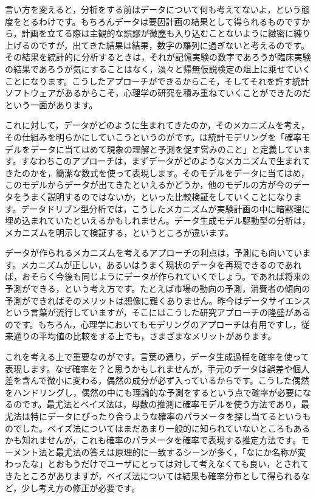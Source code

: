 \documentclass{ltjsbook}
\begin{document}
言い方を変えると，分析をする前はデータについて何も考えてないよ，という態度をとるわけです。もちろんデータは要因計画の結果として得られるものですから，計画を立てる際は主観的な誤謬が微塵も入り込むことないように緻密に練り上げるのですが，出てきた結果は結果，数字の羅列に過ぎないと考えるのです。その結果を統計的に分析するときは，それが記憶実験の数字であろうが臨床実験の結果であろうが気にすることはなく，淡々と帰無仮説検定の俎上に乗せていくことになります。こうしたアプローチができるからこそ，そしてそれを許す統計ソフトウェアがあるからこそ，心理学の研究を積み重ねていくことができたのだという一面があります。

これに対して，データがどのように生まれてきたのか，そのメカニズムを考え，その仕組みを明らかにしていこうというのがです。\citet{Matsuura201610}は統計モデリングを「確率モデルをデータに当てはめて現象の理解と予測を促す営みのこと」と定義しています。すなわちこのアプローチは，まずデータがどのようなメカニズムで生まれてきたのかを，簡潔な数式を使って表現します。そのモデルをデータに当てはめ，このモデルからデータが出てきたといえるかどうか，他のモデルの方が今のデータをうまく説明するのではないか，といった比較検証をしていくことになります。データドリブン型分析では，こうしたメカニズムが実験計画の中に暗黙理に埋め込まれていたといえるかもしれません。データ生成モデル駆動型の分析は，メカニズムを明示して検証する，というところが違います。

データが作られるメカニズムを考えるアプローチの利点は，予測にも向いています。メカニズムが正しい，あるいはうまく現状のデータを再現できるのであれば，おそらく今後も同じようにデータが作られていくでしょう。であれば将来の予測ができる，という考え方です。たとえば市場の動向の予測，消費者の傾向の予測ができればそのメリットは想像に難くありません。昨今はデータサイエンスという言葉が流行していますが，そこにはこうした研究アプローチの隆盛があるのです。もちろん，心理学においてもモデリングのアプローチは有用ですし，従来通りの平均値の比較をする上でも，さまざまなメリットがあります。

これを考える上で重要なのがです。言葉の通り，データ生成過程を確率を使って表現します。なぜ確率を？と思うかもしれませんが，手元のデータは誤差や個人差を含んで微小に変わる，偶然の成分が必ず入っているからです。こうした偶然をハンドリングし，偶然の中にも理論的な予測をするという点で確率が必要になるのです。最尤法とベイズ法は，母数の推測に確率モデルを使う方法であり，最尤法は特にデータにぴったり合うような確率のパラメータを探し当てるというものでした。ベイズ法についてはまだあまり一般的に知られていないところもあるかも知れませんが，これも確率のパラメータを確率で表現する推定方法です。モーメント法と最尤法の答えは原理的に一致するシーンが多く，「なにか名称が変わったな」とおもうだけでユーザにとっては対して考えなくても良い，とされてきたところがありますが，ベイズ法については結果も確率分布として得られるなど，少し考え方の修正が必要です。
\end{document}
